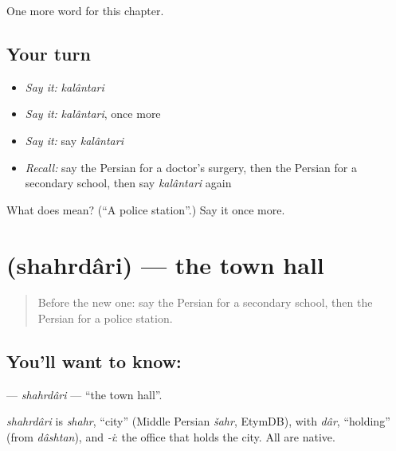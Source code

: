 \begin{grammarlens}[title={What you've built}]
One more word for this chapter.
\end{grammarlens}

\subsection*{Your turn}
\begin{itemize}
\raggedright
  \item \emph{Say it:} \emph{kalântari}
  \item \emph{Say it:} \emph{kalântari}, once more
  \item \emph{Say it:} say \emph{kalântari}
  \item \emph{Recall:} say the Persian for a doctor's surgery, then the Persian for a secondary school, then say \emph{kalântari} again
\end{itemize}

\begin{tcolorbox}[breakable,colback=teal!4,colframe=teal!35!black,title={Before you move on}]
What does  mean? (\textquotedblleft{}A police station\textquotedblright{}.) Say it once more.
\end{tcolorbox}
\section[\texorpdfstring{\fa{شهرداری} (shahrdâri)}{شهرداری (shahrdâri)}]{ (shahrdâri) — the town hall}

\label{lesson:FA-C155-shahrdari}



\begin{quote}
Before the new one: say the Persian for a secondary school, then the Persian for a police station.
\end{quote}

\subsection*{You'll want to know: }
\textbf{} — \emph{shahrdâri} — \textquotedblleft{}the town hall\textquotedblright{}.

\begin{cousinweb}
\emph{shahrdâri} is \emph{shahr}, \textquotedblleft{}city\textquotedblright{} (Middle Persian \emph{šahr}, EtymDB), with \emph{dâr}, \textquotedblleft{}holding\textquotedblright{} (from \emph{dâshtan}), and \emph{-i}: the office that holds the city. All are native.
\end{cousinweb}

